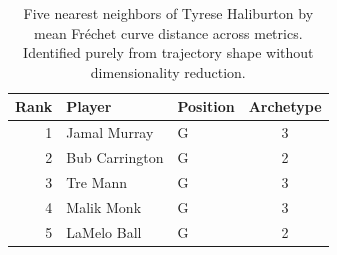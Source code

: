 \begin{table}[htbp]
  \centering\small
  \begin{tabular}{rllc}
    \toprule
    Rank & Player & Position & Archetype \\
    \midrule
    1 & Jamal Murray & G & 3 \\
    2 & Bub Carrington & G & 2 \\
    3 & Tre Mann & G & 3 \\
    4 & Malik Monk & G & 3 \\
    5 & LaMelo Ball & G & 2 \\
    \bottomrule
  \end{tabular}
  \caption{Five nearest neighbors of Tyrese Haliburton by mean Fr\'{e}chet curve distance across metrics. Identified purely from trajectory shape without dimensionality reduction.}
  \label{tab:Tyrese_Haliburton_frechet_curve_neighbors}
\end{table}

